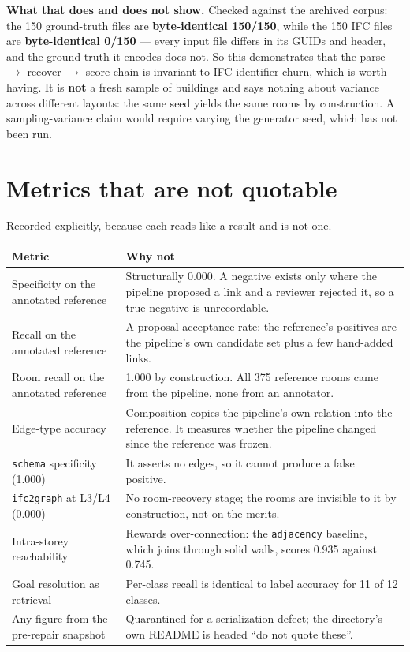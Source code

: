 \documentclass[11pt,a4paper]{article}
\newcommand{\code}[1]{\texttt{\small #1}}
\begin{document}
\textbf{What that does and does not show.} Checked against the archived corpus:
the 150 ground-truth files are \textbf{byte-identical 150/150}, while the 150
IFC files are \textbf{byte-identical 0/150} --- every input file differs in its
GUIDs and header, and the ground truth it encodes does not. So this
demonstrates that the parse $\to$ recover $\to$ score chain is invariant to IFC
identifier churn, which is worth having. It is \textbf{not} a fresh sample of
buildings and says nothing about variance across different layouts: the same
seed yields the same rooms by construction. A sampling-variance claim would
require varying the generator seed, which has not been run.

\section{Metrics that are not quotable}
\label{sec:notquotable}

Recorded explicitly, because each reads like a result and is not one.

\begin{longtable}{p{}p{}}
\toprule
Metric & Why not \\
\midrule
\endhead
Specificity on the annotated reference & Structurally 0.000. A negative exists
only where the pipeline proposed a link and a reviewer rejected it, so a true
negative is unrecordable. \\
Recall on the annotated reference & A proposal-acceptance rate: the reference's
positives are the pipeline's own candidate set plus a few hand-added links. \\
Room recall on the annotated reference & 1.000 by construction. All 375
reference rooms came from the pipeline, none from an annotator. \\
Edge-type accuracy & Composition copies the pipeline's own relation into the
reference. It measures whether the pipeline changed since the reference was
frozen. \\
\code{schema} specificity (1.000) & It asserts no edges, so it cannot produce a
false positive. \\
\code{ifc2graph} at L3/L4 (0.000) & No room-recovery stage; the rooms are
invisible to it by construction, not on the merits. \\
Intra-storey reachability & Rewards over-connection: the \code{adjacency}
baseline, which joins through solid walls, scores 0.935 against 0.745. \\
Goal resolution as retrieval & Per-class recall is identical to label accuracy
for 11 of 12 classes. \\
Any figure from the pre-repair snapshot & Quarantined for a serialization
defect; the directory's own README is headed ``do not quote these''. \\
\bottomrule
\end{longtable}
\end{document}
